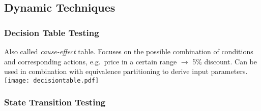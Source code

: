 \subsection{Dynamic Techniques}

\subsubsection{Decision Table Testing}
Also called \textit{cause-effect} table. Focuses on the possible combination of conditions and corresponding actions, e.g.\ price in a certain range $\to$ 5\% discount. Can be used in combination with equivalence partitioning to derive input parameters.\\
\texttt{[image: decisiontable.pdf]}

\subsubsection{State Transition Testing}

